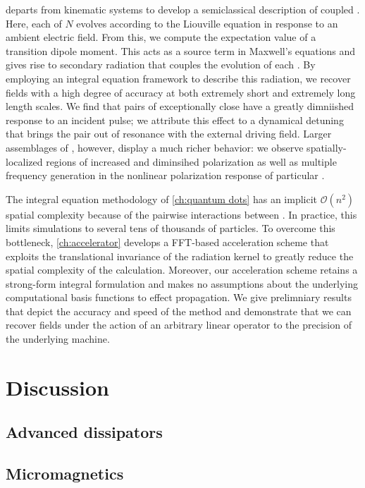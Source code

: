  departs from kinematic systems to develop a semiclassical description of coupled \qds{}.
Here, each of $N$ \qds{} evolves according to the Liouville equation in response to an ambient electric field.
From this, we compute the expectation value of a transition dipole moment.
This acts as a source term in Maxwell's equations and gives rise to secondary radiation that couples the evolution of each \qd{}.
By employing an integral equation framework to describe this radiation, we recover fields with a high degree of accuracy at both extremely short and extremely long length scales.
We find that pairs of exceptionally close \qds{} have a greatly dimniished response to an incident pulse; we attribute this effect to a dynamical detuning that brings the pair out of resonance with the external driving field. 
Larger assemblages of \qds{}, however, display a much richer behavior: we observe spatially-localized regions of increased and diminsihed polarization as well as multiple frequency generation in the nonlinear polarization response of particular \qds{}.

The integral equation methodology of \cref{ch:quantum dots} has an implicit $\mathcal{O}(n^2)$ spatial complexity because of the pairwise interactions between \qds{}.
In practice, this limits simulations to several tens of thousands of particles.
To overcome this bottleneck, \cref{ch:accelerator} develops a FFT-based acceleration scheme that exploits the translational invariance of the radiation kernel to greatly reduce the spatial complexity of the calculation.
Moreover, our acceleration scheme retains a strong-form integral formulation and makes no assumptions about the underlying computational basis functions to effect propagation.
We give prelimniary results that depict the accuracy and speed of the method and demonstrate that we can recover fields under the action of an arbitrary linear operator to the precision of the underlying machine.

\section{Discussion}

\subsection{Advanced dissipators}

\subsection{Micromagnetics}

